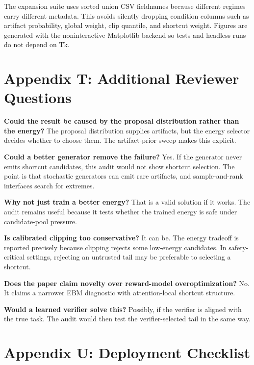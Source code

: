 \documentclass{article}
\begin{document}
The expansion suite uses sorted union CSV fieldnames because different regimes
carry different metadata. This avoids silently dropping condition columns such
as artifact probability, global weight, clip quantile, and shortcut weight.
Figures are generated with the noninteractive Matplotlib backend so tests and
headless runs do not depend on Tk.

\section{Appendix T: Additional Reviewer Questions}

\textbf{Could the result be caused by the proposal distribution rather than the
energy?} The proposal distribution supplies artifacts, but the energy selector
decides whether to choose them. The artifact-prior sweep makes this explicit.

\textbf{Could a better generator remove the failure?} Yes. If the generator
never emits shortcut candidates, this audit would not show shortcut selection.
The point is that stochastic generators can emit rare artifacts, and
sample-and-rank interfaces search for extremes.

\textbf{Why not just train a better energy?} That is a valid solution if it
works. The audit remains useful because it tests whether the trained energy is
safe under candidate-pool pressure.

\textbf{Is calibrated clipping too conservative?} It can be. The energy
tradeoff is reported precisely because clipping rejects some low-energy
candidates. In safety-critical settings, rejecting an untrusted tail may be
preferable to selecting a shortcut.

\textbf{Does the paper claim novelty over reward-model overoptimization?} No.
It claims a narrower EBM diagnostic with attention-local shortcut structure.

\textbf{Would a learned verifier solve this?} Possibly, if the verifier is
aligned with the true task. The audit would then test the verifier-selected
tail in the same way.

\section{Appendix U: Deployment Checklist}
\end{document}
